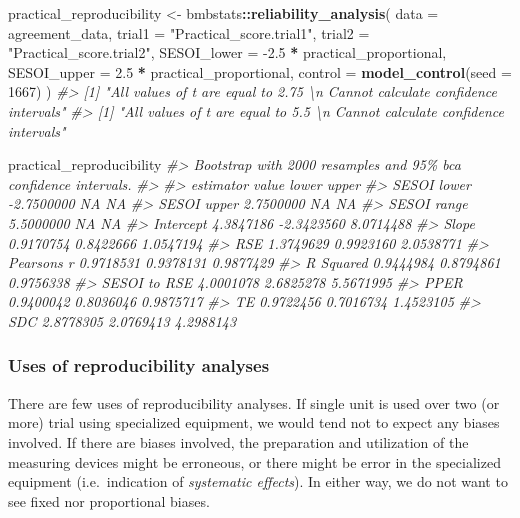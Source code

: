 \documentclass[
]{book}
\newenvironment{Shaded}{\begin{snugshade}}{\end{snugshade}}
\newcommand{\CommentTok}[1]{\textcolor[rgb]{0.56,0.35,0.01}{\textit{#1}}}
\newcommand{\DataTypeTok}[1]{\textcolor[rgb]{0.13,0.29,0.53}{#1}}
\newcommand{\DecValTok}[1]{\textcolor[rgb]{0.00,0.00,0.81}{#1}}
\newcommand{\FloatTok}[1]{\textcolor[rgb]{0.00,0.00,0.81}{#1}}
\newcommand{\KeywordTok}[1]{\textcolor[rgb]{0.13,0.29,0.53}{\textbf{#1}}}
\newcommand{\NormalTok}[1]{#1}
\newcommand{\OperatorTok}[1]{\textcolor[rgb]{0.81,0.36,0.00}{\textbf{#1}}}
\newcommand{\StringTok}[1]{\textcolor[rgb]{0.31,0.60,0.02}{#1}}
\begin{document}
\begin{Shaded}
\begin{Highlighting}[]
\NormalTok{practical\_reproducibility <{-}}\StringTok{ }\NormalTok{bmbstats}\OperatorTok{::}\KeywordTok{reliability\_analysis}\NormalTok{(}
  \DataTypeTok{data =}\NormalTok{ agreement\_data,}
  \DataTypeTok{trial1 =} \StringTok{"Practical\_score.trial1"}\NormalTok{,}
  \DataTypeTok{trial2 =} \StringTok{"Practical\_score.trial2"}\NormalTok{,}
  \DataTypeTok{SESOI\_lower =} \FloatTok{{-}2.5} \OperatorTok{*}\StringTok{ }\NormalTok{practical\_proportional,}
  \DataTypeTok{SESOI\_upper =} \FloatTok{2.5} \OperatorTok{*}\StringTok{ }\NormalTok{practical\_proportional,}
  \DataTypeTok{control =} \KeywordTok{model\_control}\NormalTok{(}\DataTypeTok{seed =} \DecValTok{1667}\NormalTok{)}
\NormalTok{)}
\CommentTok{\#> [1] "All values of t are equal to  2.75 \textbackslash{}n Cannot calculate confidence intervals"}
\CommentTok{\#> [1] "All values of t are equal to  5.5 \textbackslash{}n Cannot calculate confidence intervals"}

\NormalTok{practical\_reproducibility}
\CommentTok{\#> Bootstrap with 2000 resamples and 95\% bca confidence intervals.}
\CommentTok{\#> }
\CommentTok{\#>     estimator      value      lower     upper}
\CommentTok{\#>   SESOI lower {-}2.7500000         NA        NA}
\CommentTok{\#>   SESOI upper  2.7500000         NA        NA}
\CommentTok{\#>   SESOI range  5.5000000         NA        NA}
\CommentTok{\#>     Intercept  4.3847186 {-}2.3423560 8.0714488}
\CommentTok{\#>         Slope  0.9170754  0.8422666 1.0547194}
\CommentTok{\#>           RSE  1.3749629  0.9923160 2.0538771}
\CommentTok{\#>   Pearson\textquotesingle{}s r  0.9718531  0.9378131 0.9877429}
\CommentTok{\#>     R Squared  0.9444984  0.8794861 0.9756338}
\CommentTok{\#>  SESOI to RSE  4.0001078  2.6825278 5.5671995}
\CommentTok{\#>          PPER  0.9400042  0.8036046 0.9875717}
\CommentTok{\#>            TE  0.9722456  0.7016734 1.4523105}
\CommentTok{\#>           SDC  2.8778305  2.0769413 4.2988143}
\end{Highlighting}
\end{Shaded}

\hypertarget{uses-of-reproducibility-analyses}{%
\subsubsection{Uses of reproducibility analyses}\label{uses-of-reproducibility-analyses}}

There are few uses of reproducibility analyses. If single unit is used over two (or more) trial using specialized equipment, we would tend not to expect any biases involved. If there are biases involved, the preparation and utilization of the measuring devices might be erroneous, or there might be error in the specialized equipment (i.e.~indication of \emph{systematic effects}). In either way, we do not want to see fixed nor proportional biases.
\end{document}
